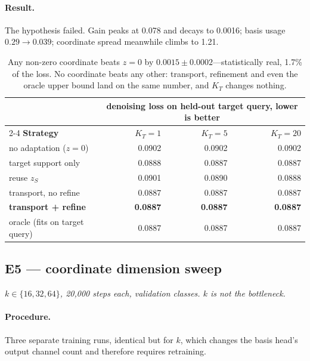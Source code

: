 \documentclass[11pt]{article}
\newcommand{\KT}{K_{T}}
\newcommand{\zS}{z_{S}}
\begin{document}
\paragraph{Result.} The hypothesis failed. Gain peaks at 0.078 and decays to 0.0016; basis usage
$0.29\to0.039$; coordinate spread meanwhile climbs to 1.21.

\begin{table}[htbp]
\centering\small
\begin{tabular}{@{}lrrr@{}}
\toprule
& \multicolumn{3}{c}{denoising loss on held-out target query, lower is better} \\
\cmidrule(lr){2-4}
\textbf{Strategy} & $\KT=1$ & $\KT=5$ & $\KT=20$ \\
\midrule
no adaptation ($z=0$)  & 0.0902 & 0.0902 & 0.0902 \\
target support only    & 0.0888 & 0.0887 & 0.0887 \\
reuse $\zS$            & 0.0901 & 0.0890 & 0.0888 \\
transport, no refine   & 0.0887 & 0.0887 & 0.0887 \\
\textbf{transport + refine} & \textbf{0.0887} & \textbf{0.0887} & \textbf{0.0887} \\
oracle (fits on target query) & 0.0887 & 0.0887 & 0.0887 \\
\bottomrule
\end{tabular}
\caption{Any non-zero coordinate beats $z=0$ by $0.0015\pm0.0002$---statistically real, 1.7\% of
the loss. No coordinate beats any other: transport, refinement and even the oracle upper bound land
on the same number, and $\KT$ changes nothing.}
\end{table}

\subsection{E5 --- coordinate dimension sweep}

\textit{$k\in\{16,32,64\}$, 20{,}000 steps each, validation classes. $k$ is not the bottleneck.}

\paragraph{Procedure.} Three separate training runs, identical but for $k$, which changes the basis
head's output channel count and therefore requires retraining.
\end{document}
